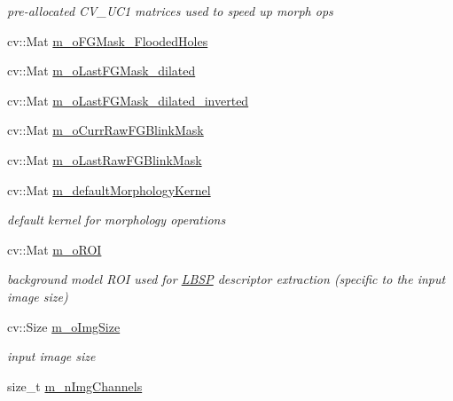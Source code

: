 \begin{DoxyCompactItemize}
\begin{DoxyCompactList}\small\item\em pre-\/allocated C\+V\+\_\+U\+C1 matrices used to speed up morph ops \end{DoxyCompactList}\item 
cv\+::\+Mat \mbox{\hyperlink{class_background_subtractor_su_b_s_e_n_s_e_a4a8df16fa54d4b22a9b787d5b57427f9}{m\+\_\+o\+F\+G\+Mask\+\_\+\+Flooded\+Holes}}
\item 
cv\+::\+Mat \mbox{\hyperlink{class_background_subtractor_su_b_s_e_n_s_e_a2dc6a8f1c8e2694d19dbbb74c533e293}{m\+\_\+o\+Last\+F\+G\+Mask\+\_\+dilated}}
\item 
cv\+::\+Mat \mbox{\hyperlink{class_background_subtractor_su_b_s_e_n_s_e_a0306555d3e97ceec32f8f6b495d18b95}{m\+\_\+o\+Last\+F\+G\+Mask\+\_\+dilated\+\_\+inverted}}
\item 
cv\+::\+Mat \mbox{\hyperlink{class_background_subtractor_su_b_s_e_n_s_e_a804b5ad0898777a2eb2cb4d932c857b6}{m\+\_\+o\+Curr\+Raw\+F\+G\+Blink\+Mask}}
\item 
cv\+::\+Mat \mbox{\hyperlink{class_background_subtractor_su_b_s_e_n_s_e_aea0e3a3817d99da5b2fe15c810b0f428}{m\+\_\+o\+Last\+Raw\+F\+G\+Blink\+Mask}}
\item 
cv\+::\+Mat \mbox{\hyperlink{class_background_subtractor_su_b_s_e_n_s_e_ae360b93378aa04b34aebc23b5f6e6714}{m\+\_\+default\+Morphology\+Kernel}}
\begin{DoxyCompactList}\small\item\em default kernel for morphology operations \end{DoxyCompactList}\item 
cv\+::\+Mat \mbox{\hyperlink{class_background_subtractor_l_b_s_p_a53fe98bd2489d95de5292467145901e9}{m\+\_\+o\+R\+OI}}
\begin{DoxyCompactList}\small\item\em background model R\+OI used for \mbox{\hyperlink{class_l_b_s_p}{L\+B\+SP}} descriptor extraction (specific to the input image size) \end{DoxyCompactList}\item 
cv\+::\+Size \mbox{\hyperlink{class_background_subtractor_l_b_s_p_a732d5e6ae35fb0e858cadb3af5ce08a2}{m\+\_\+o\+Img\+Size}}
\begin{DoxyCompactList}\small\item\em input image size \end{DoxyCompactList}\item 
size\+\_\+t \mbox{\hyperlink{class_background_subtractor_l_b_s_p_ab3467ebee2c5d1249061ccd704cc0584}{m\+\_\+n\+Img\+Channels}}

\end{DoxyCompactItemize}
